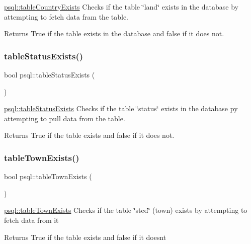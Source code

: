 \mbox{\hyperlink{classpsql_ae0ab0012c58471bd3fd63c286fb22224}{psql\+::table\+Country\+Exists}} Checks if the table \char`\"{}land\char`\"{} exists in the database by attempting to fetch data fram the table. 

\begin{DoxyReturn}{Returns}
True if the table exists in the database and false if it does not. 
\end{DoxyReturn}
\mbox{\label{classpsql_a3f8bac89bd0cee3af77e47e5c555543d}} 
\subsubsection{\texorpdfstring{tableStatusExists()}{tableStatusExists()}}
{\footnotesize\ttfamily bool psql\+::table\+Status\+Exists (\begin{DoxyParamCaption}{ }\end{DoxyParamCaption})}



\mbox{\hyperlink{classpsql_a3f8bac89bd0cee3af77e47e5c555543d}{psql\+::table\+Status\+Exists}} Checks if the table \char`\"{}status\char`\"{} exists in the database py attempting to pull data from the table. 

\begin{DoxyReturn}{Returns}
True if the table exists and false if it does not. 
\end{DoxyReturn}
\mbox{\label{classpsql_a717162b7d7faa0fb41b5a526e42de4ac}} 
\subsubsection{\texorpdfstring{tableTownExists()}{tableTownExists()}}
{\footnotesize\ttfamily bool psql\+::table\+Town\+Exists (\begin{DoxyParamCaption}{ }\end{DoxyParamCaption})}



\mbox{\hyperlink{classpsql_a717162b7d7faa0fb41b5a526e42de4ac}{psql\+::table\+Town\+Exists}} Checks if the table \char`\"{}sted\char`\"{} (town) exists by attempting to fetch data from it 

\begin{DoxyReturn}{Returns}
True if the table exists and false if it does\textquotesingle{}nt 
\end{DoxyReturn}
\mbox{\label{classpsql_a836eea3c6deb2d6a3a357193a99d6ee7}} 
